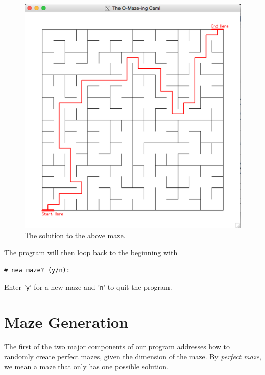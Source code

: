 \documentclass[11pt, margin=1in]{article}
\begin{document}
\begin{figure}[H]
\begin{center}
\includegraphics[scale=0.32]{solution.jpg}
\caption{The solution to the above maze.}
\end{center}
\end{figure}


 The program will then loop back to the beginning with 

\begin{flushleft}
\quad \quad \texttt{\# new maze? (y/n): } 
\end{flushleft}


Enter '\texttt{y}' for a new maze and  '\texttt{n}' to quit the program.


    

\section{Maze Generation}

The first of the two major components of our program addresses how to randomly create perfect mazes, given the dimension of the maze. By \emph{perfect maze}, we mean a maze that only has one possible solution.    
\end{document}
